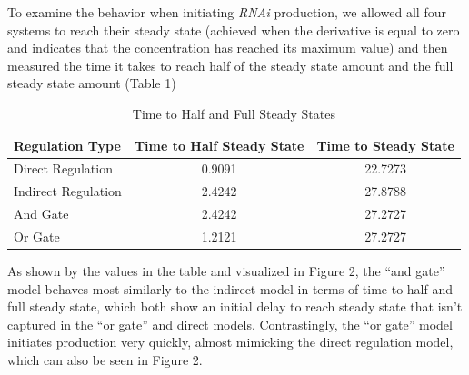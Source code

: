 \documentclass{article}
\begin{document}
To examine the behavior when initiating \textit{RNAi} production, we allowed all four systems to reach their steady state (achieved when the derivative is equal to zero and indicates that the concentration has reached its maximum value) and then measured the time it takes to reach half of the steady state amount and the full steady state amount (Table 1) 

\begin{table}[h]
    \centering
    \caption{Time to Half and Full Steady States}
    \begin{tabular}{@{}lcc@{}}
        \toprule
        \textbf{Regulation Type} & \textbf{Time to Half Steady State} & \textbf{Time to Steady State} \\ 
        \midrule
        Direct Regulation & 0.9091 & 22.7273 \\ 
        Indirect Regulation & 2.4242 & 27.8788 \\ 
        And Gate & 2.4242 & 27.2727 \\ 
        Or Gate & 1.2121 & 27.2727 \\ 
        \bottomrule
    \end{tabular}
\end{table}

\pagebreak

As shown by the values in the table and visualized in Figure 2, the ``and gate'' model behaves most similarly to the indirect model in terms of time to half and full steady state, which both show an initial delay to reach steady state that isn't captured in the ``or gate'' and direct models. Contrastingly, the ``or gate'' model initiates production very quickly, almost mimicking the direct regulation model, which can also be seen in Figure 2. 
\end{document}
